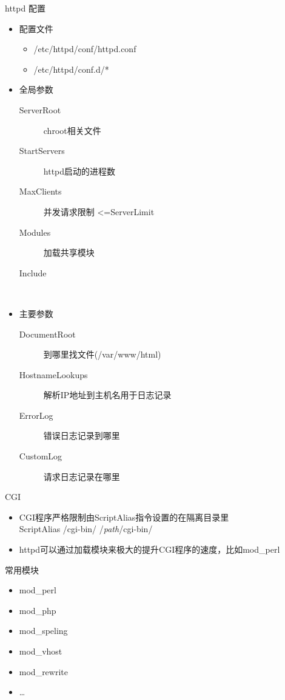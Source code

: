 \begin{frame}{httpd 配置}
\begin{itemize}
\item 配置文件

\begin{itemize}
\item /etc/httpd/conf/httpd.conf
\item /etc/httpd/conf.d/{*}
\end{itemize}
\item 全局参数

\begin{description}
\item [{ServerRoot}] chroot相关文件
\item [{StartServers}] httpd启动的进程数
\item [{MaxClients}] 并发请求限制 <=ServerLimit
\item [{Modules}] 加载共享模块
\item [{Include}]~
\end{description}
\item 主要参数

\begin{description}
\item [{DocumentRoot}] 到哪里找文件(/var/www/html)
\item [{HostnameLookups}] 解析IP地址到主机名用于日志记录
\item [{ErrorLog}] 错误日志记录到哪里
\item [{CustomLog}] 请求日志记录在哪里
\end{description}
\end{itemize}



\end{frame} 
\begin{frame}{CGI}
\begin{itemize}
\item CGI程序严格限制由ScriptAlias指令设置的在隔离目录里\\
ScriptAlias /cgi-bin/ /\emph{path}/cgi-bin/
\item httpd可以通过加载模块来极大的提升CGI程序的速度，比如mod\_perl
\end{itemize}

\end{frame} 
\begin{frame}{常用模块}
\begin{itemize}
\item mod\_perl
\item mod\_php
\item mod\_speling
\item mod\_vhost
\item mod\_rewrite
\item \ldots{}
\end{itemize}

\end{frame} 
